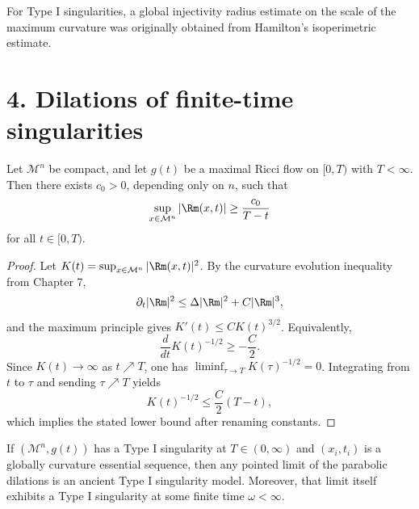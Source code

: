 \begin{remark}
\label{ch08-rem-hamilton-injectivity}
For Type I singularities, a global injectivity radius estimate on the scale of the maximum curvature was originally obtained from Hamilton's isoperimetric estimate.
\end{remark}

\section*{4. Dilations of finite-time singularities}

\begin{lemma}
\label{ch08-lem-finite-time-blowup-rate}
Let \(\mathcal M^n\) be compact, and let \(g(t)\) be a maximal Ricci flow on \([0,T)\) with \(T<\infty\). Then there exists \(c_0>0\), depending only on \(n\), such that
\[
\sup_{x\in\mathcal M^n}|\Rm(x,t)|\ge \frac{c_0}{T-t}
\]
for all \(t\in[0,T)\).
\end{lemma}

\begin{proof}
\sketch Let \(K(t)=\sup_{x\in\mathcal M^n}|\Rm(x,t)|^2\). By the curvature evolution inequality from Chapter 7,
\[
\partial_t |\Rm|^2\le \Delta |\Rm|^2+C|\Rm|^3,
\]
and the maximum principle gives \(K'(t)\le C K(t)^{3/2}\). Equivalently,
\[
\frac{d}{dt}K(t)^{-1/2}\ge -\frac C2.
\]
Since \(K(t)\to\infty\) as \(t\nearrow T\), one has \(\liminf_{\tau\to T}K(\tau)^{-1/2}=0\). Integrating from \(t\) to \(\tau\) and sending \(\tau\nearrow T\) yields
\[
K(t)^{-1/2}\le \frac C2(T-t),
\]
which implies the stated lower bound after renaming constants.
\end{proof}

\begin{proposition}
\label{ch08-prop-type-i-limits}
If \((\mathcal M^n,g(t))\) has a Type I singularity at \(T\in(0,\infty)\) and \((x_i,t_i)\) is a globally curvature essential sequence, then any pointed limit of the parabolic dilations is an ancient Type I singularity model. Moreover, that limit itself exhibits a Type I singularity at some finite time \(\omega<\infty\).
\end{proposition}

